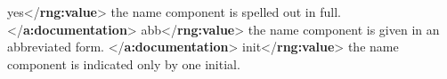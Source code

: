 \begin{shaded}
\mbox{}\newline 
\hspace*{1em}\mbox{}\newline 
\hspace*{1em}\hspace*{1em}\mbox{}\newline 
\hspace*{1em}\hspace*{1em}\hspace*{1em}yes{</\textbf{rng:value}>}\mbox{}\newline 
\hspace*{1em}\hspace*{1em}\hspace*{1em} the name component is spelled out in full. {</\textbf{a:documentation}>}\mbox{}\newline 
\hspace*{1em}\hspace*{1em}\hspace*{1em}abb{</\textbf{rng:value}>}\mbox{}\newline 
\hspace*{1em}\hspace*{1em}\hspace*{1em} the name component is given in an abbreviated form. {</\textbf{a:documentation}>}\mbox{}\newline 
\hspace*{1em}\hspace*{1em}\hspace*{1em}init{</\textbf{rng:value}>}\mbox{}\newline 
\hspace*{1em}\hspace*{1em}\hspace*{1em} the name component is indicated only by one initial.\mbox{}\newline 

\end{shaded}
